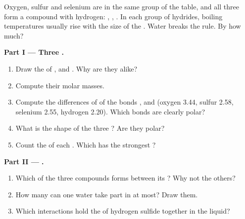 \begin{problem}
\label{pb:g11:polarity-and-cohesion:1}
Oxygen, sulfur and selenium are in the same group of the table, and all
three form a compound with hydrogen: , , . In
each group of hydrides, boiling temperatures usually rise with the size
of the . Water breaks the rule. By how much?

\medskip
\noindent\textbf{Part I --- Three .}
\begin{enumerate}
  \item Draw the  of ,  and .
        Why are they alike?
  \item Compute their molar masses.
  \item Compute the differences of  of the bonds
        ,  and  (oxygen 3.44, sulfur 2.58,
        selenium 2.55, hydrogen 2.20). Which bonds are clearly polar?
  \item What is the shape of the three ? Are they polar?
  \item Count the  of each . Which has the strongest ?
\end{enumerate}

\medskip
\noindent\textbf{Part II --- .}
\begin{enumerate}[resume]
  \item Which of the three compounds forms  between its
        ? Why not the others?
  \item How many  can one water  take part in at
        most? Draw them.
  \item Which interactions hold the  of hydrogen sulfide
        together in the liquid?
\end{enumerate}


\end{problem}
